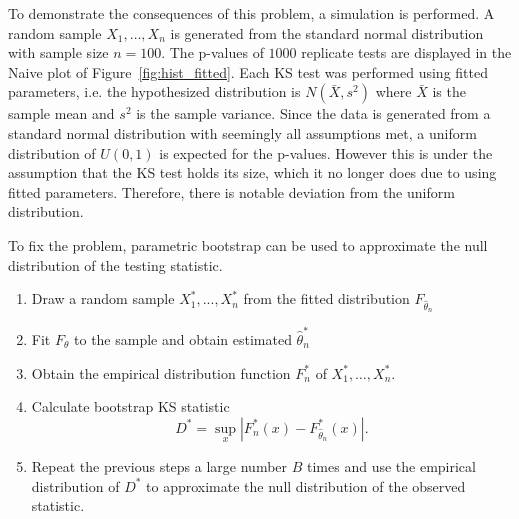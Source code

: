 \documentclass[12pt, letterpaper, titlepage]{article}
\begin{document}
To demonstrate the consequences of this problem, a simulation is performed. A 
random sample $X_1, \ldots, X_n$ is generated from the standard normal 
distribution with sample size $n = 100$. The p-values of $1000$ replicate tests 
are displayed in the Naive plot of Figure~\ref{fig:hist_fitted}. Each KS test 
was performed using fitted parameters, i.e. the hypothesized distribution is 
$N(\bar X, s^2)$ where $\bar X$ is the sample mean and $s^2$ is the sample 
variance. Since the data is generated from a standard normal distribution with 
seemingly all assumptions met, a uniform distribution of $U(0, 1)$ is expected 
for the p-values. However this is under the assumption that the KS test holds 
its size, which it no longer does due to using fitted parameters. Therefore, 
there is notable deviation from the uniform distribution. 


To fix the problem, parametric bootstrap can be used to approximate the null
distribution of the testing statistic. 
\begin{enumerate}
  \item 
    Draw a random sample $X_1^*,...,X_n^*$ from the fitted distribution 
    $F_{\hat\theta_n}$
  \item 
    Fit $F_\theta$ to the sample and obtain estimated $\hat\theta_n^*$
  \item
    Obtain the empirical distribution function $F_n^*$ of $X_1^*, \ldots, 
    X_n^*$.
  \item 
    Calculate bootstrap KS statistic
    \[
      D^* = \sup_x | F_n^* (x)- F_{\hat\theta_n}^*(x) |.
    \]
  \item
    Repeat the previous steps a large number $B$ times and use the empirical 
    distribution of $D^*$ to approximate the null distribution of the observed 
    statistic.    
\end{enumerate}
\end{document}

